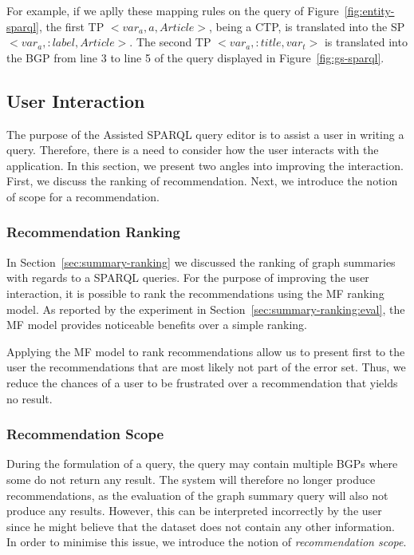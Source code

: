 For example, if we aplly these mapping rules on the query of Figure~\ref{fig:entity-sparql}, the first TP \mbox{$<var_a, a, Article>$}, being a CTP, is translated into the SP \mbox{$<var_a, :label, Article>$}. The second TP \mbox{$<var_a, :title, var_t>$} is translated into the BGP from line 3 to line 5 of the query displayed in Figure~\ref{fig:gs-sparql}.

\subsection{User Interaction}

The purpose of the Assisted SPARQL query editor is to assist a user in writing a query. Therefore, there is a need to consider how the user interacts with the application.
In this section, we present two angles into improving the interaction. First, we discuss the ranking of recommendation. Next, we introduce the notion of scope for a recommendation.

\subsubsection{Recommendation Ranking}

In Section~\ref{sec:summary-ranking} we discussed the ranking of graph summaries with regards to a SPARQL queries. For the purpose of improving the user interaction, it is possible to rank the recommendations using the MF ranking model. As reported by the experiment in Section~\ref{sec:summary-ranking:eval}, the MF model provides noticeable benefits over a simple ranking.

Applying the MF model to rank recommendations allow us to present first to the user the recommendations that are most likely not part of the error set. Thus, we reduce the chances of a user to be frustrated over a recommendation that yields no result.

\subsubsection{Recommendation Scope}

During the formulation of a query, the query may contain multiple BGPs where some do not return any result. The system will therefore no longer produce recommendations, as the evaluation of the graph summary query will also not produce any results. However, this can be interpreted incorrectly by the user since he might believe that the dataset does not contain any other information. In order to minimise this issue, we introduce the notion of \emph{recommendation scope}.\\

